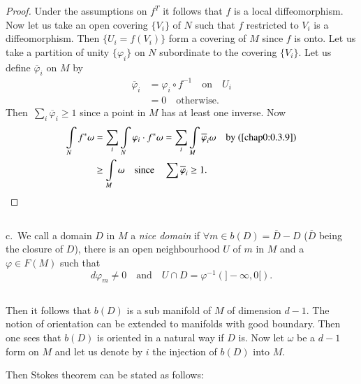 \begin{proof}
Under the assumptions on $f^{T}$ it follows that $f$ is a local
diffeomorphism. Now let us take an open covering $\{V_{i}\}$ of $N$
such that $f$ restricted to $V_{i}$ is a diffeomorphism. Then
$\{U_{i}=f(V_{i})\}$ form a covering of $M$ since $f$ is onto. Let us
take a partition of unity $\{\varphi_{i}\}$ on $N$ subordinate to the
covering $\{V_{i}\}$. Let us define $\overline{\varphi}_{i}$ on $M$ by
\begin{align*}
\overline{\varphi}_{i} &= \varphi_{i}\circ f^{-1}\quad\text{on}\quad
U_{i}\\
&= 0\quad\text{otherwise}.
\end{align*}
Then\pageoriginale\, $\sum\limits_{i}\overline{\varphi}_{i}\geq 1$ since
a point in $M$ has at least one inverse. Now
\begin{align*}
\int\limits_{N}f^{\ast}\omega &= \sum_{i}\int\limits_{N}\varphi_{i}\cdot
f^{\ast}\omega=\sum_{i}\int\limits_{M}\overline{\varphi}_{i}\omega\quad\text{by (\ref{chap0:0.3.9})}\\
&\geq \int\limits_{M}\omega\quad\text{since}\quad \sum
\overline{\varphi}_{i}\geq 1.
\end{align*}
\end{proof}

\setcounter{subsection}{10}
\subsection{}\label{chap0:0.3.11}

c.~We call a domain $D$ in $M$ a {\em nice domain} if $\forall m\in
b(D)=\overline{D}-D$ ($\overline{D}$ being the closure of $D$), there
is an open neighbourhood $U$ of $m$ in $M$ and a $\varphi\in F(M)$
such that
$$
d\varphi_{m}\neq 0\quad\text{and}\quad U\cap D=\varphi^{-1}(]-\infty,0[).
$$

\subsection{}\label{chap0:0.3.12}

Then it follows that $b(D)$ is a sub manifold of $M$ of dimension
$d-1$. The notion of orientation can be extended to manifolds with
good boundary. Then one sees that $b(D)$ is oriented in a natural way
if $D$ is. Now let $\omega$ be a $d-1$ form on $M$ and let us denote
by $i$ the injection of $b(D)$ into $M$.

Then Stokes theorem can be stated as follows:


